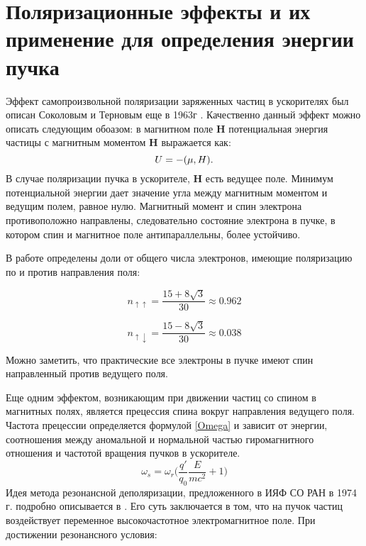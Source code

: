 \chapter{Поляризационные эффекты и их применение для определения энергии пучка}
\label{sec:respnant_dep}
Эффект самопроизвольной поляризации заряженных частиц в ускорителях был описан Соколовым и Терновым еще в 1963г \cite{SokolovTernov63}. Качественно данный эффект можно описать следующим обоазом: в магнитном поле $\boldsymbol{H}$ потенциальная энергия частицы с магнитным моментом  $\boldsymbol{H}$ выражается как: 
\begin{equation}
U = - (\boldmath{\mu}, \boldmath{H}).
\end{equation} 
В случае поляризации пучка в ускорителе, $\boldsymbol{H}$ есть ведущее поле. Минимум потенциальной энергии дает значение угла между магнитным моментом и ведущим полем, равное нулю. Магнитный момент и спин электрона противоположно направлены, следовательно состояние электрона в пучке, в котором спин и магнитное поле антипараллельны, более устойчиво.
\par В работе  \cite{sokolov} определены доли от общего числа электронов, имеющие поляризацию по и против направления поля: 
\begin{multicols}{2}
	\begin{equation}
	n_{\uparrow\uparrow} = \frac{15+8\sqrt{3}}{30} \approx 0.962 
	\end{equation}
	
	\begin{equation}
	n_{\uparrow\downarrow} = \frac{15-8\sqrt{3}}{30} \approx 0.038
	\end{equation}
\end{multicols}
Можно заметить, что практические все электроны в пучке имеют спин направленный против ведущего поля. 
\par Еще одним эффектом, возникающим при движении частиц со спином в магнитных полях, является прецессия спина вокруг направления ведущего поля. Частота прецессии определяется формулой \ref{Omega} и зависит от энергии, соотношения между аномальной и нормальной частью гиромагнитного отношения и частотой вращения пучков в ускорителе. 
\begin{equation}
\omega_s=  \omega_{r}\bigg(\frac{q'}{q_0}\frac{E}{mc^2}+1\bigg) \label{Omega}
\end{equation}
Идея метода резонансной деполяризации, предложенного в ИЯФ СО РАН в 1974 г. подробно описывается в \cite{skrinskii}. Его суть заключается в том, что на пучок частиц воздействует переменное высокочастотное электромагнитное поле. При достижении резонансного условия: 
